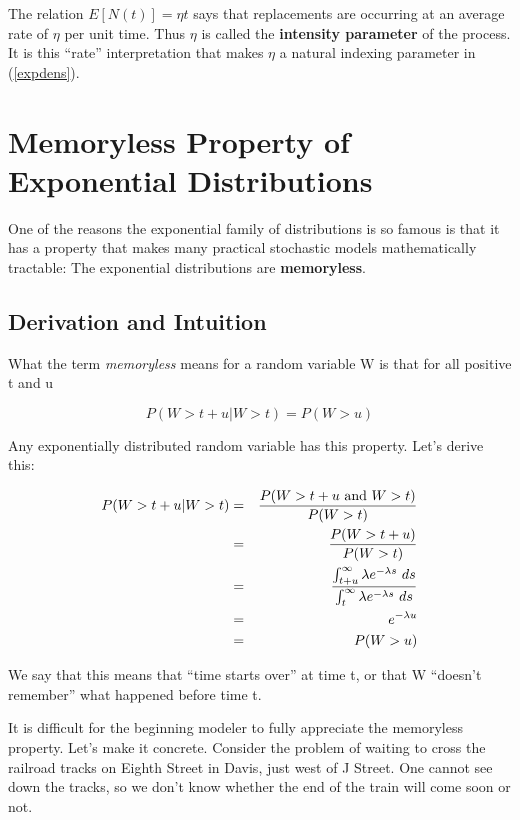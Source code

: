 The relation $E[N(t)] = \eta t$ says that replacements are occurring
at an average rate of $\eta$ per unit time.  Thus $\eta$ is called
the {\bf intensity parameter} of the process.  It is this ``rate''
interpretation that makes $\eta$ a natural indexing parameter in
(\ref{expdens}).

\section{Memoryless Property of Exponential Distributions}
\label{nomemxxx}

One of the reasons the exponential family of distributions is so famous
is that it has a property that makes many practical stochastic models
mathematically tractable:  The exponential distributions are
{\bf memoryless}.  

\subsection{Derivation and Intuition}

What the term {\it memoryless} means for a random variable W
is that for all positive t and u

\begin{equation}
\label{stmtnomemxxx}
P(W > t+u | W > t) = P(W > u)
\end{equation}

Any exponentially distributed random variable has this property.
Let's derive this:

\begin{eqnarray}
\label{nomemderivxxx}
P(W > t+u | W > t) &=& \frac{P(W > t+u {\rm ~and~} W > t)}{P(W > t)} \\ 
&=& \frac{P(W > t+u)}{P(W > t)} \\
&=&  \frac
{\int_{t+u}^{\infty} \lambda e^{-\lambda s}~ ds}
{\int_{t}^{\infty} \lambda e^{-\lambda s}~ ds} \\
&=& e^{-\lambda u} \\
&=& P(W > u)
\end{eqnarray}

We say that this means that ``time starts over'' at time t, or that W
``doesn't remember'' what happened before time t.

It is difficult for the beginning modeler to fully appreciate the
memoryless property.  Let's make it concrete.  Consider the problem of
waiting to cross the railroad tracks on Eighth Street in Davis, just
west of J Street. One cannot see down the tracks, so we don't know
whether the end of the train will come soon or not.

